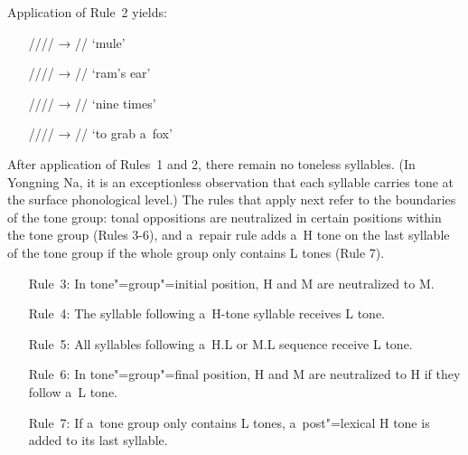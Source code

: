 {\largerpage}

Application of Rule~2 yields: 

\begin{enumerate}[itemsep=-1mm]
	\item[] //// → // ‘mule’
	\item[] //// → // ‘ram’s
	ear’
	\item[] //// → // ‘nine times’
	\item[] //// → // ‘to
	grab a~fox’
\end{enumerate}

%

After application of Rules~1 and 2, there remain no toneless syllables. (In Yongning Na, it is an exceptionless observation that each syllable carries tone at the surface phonological level.) The rules that apply next refer to the boundaries of the tone group: tonal oppositions are neutralized in certain positions within the tone group (Rules 3-6), and a~repair rule adds a~H tone on the last syllable of the tone group if the whole group only contains L tones (Rule 7).

\begin{enumerate}[leftmargin=2cm, itemsep=0pt, labelwidth=\widthof{Rule~1:}]%
	\item[Rule~3:] In tone"=group"=initial position, H and M are neutralized to M.
	\item[Rule~4:] The syllable following a~H-tone syllable receives L tone.
	\item[Rule~5:] All syllables following a~H.L or M.L sequence receive L tone.
	\item[Rule~6:] In tone"=group"=final position, H and M are neutralized to H if they follow a~L tone.
	\item[Rule~7:] If a~tone group only contains L tones, a~post"=lexical H tone is added to its last syllable.
\end{enumerate}

